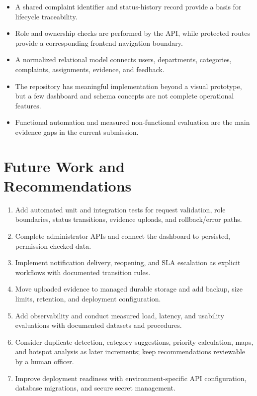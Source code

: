 \documentclass[12pt,a4paper]{report}
\begin{document}
\begin{itemize}
\item A shared complaint identifier and status-history record provide a basis for lifecycle traceability.
\item Role and ownership checks are performed by the API, while protected routes provide a corresponding frontend navigation boundary.
\item A normalized relational model connects users, departments, categories, complaints, assignments, evidence, and feedback.
\item The repository has meaningful implementation beyond a visual prototype, but a few dashboard and schema concepts are not complete operational features.
\item Functional automation and measured non-functional evaluation are the main evidence gaps in the current submission.
\end{itemize}

\section{Future Work and Recommendations}

\begin{enumerate}
\item Add automated unit and integration tests for request validation, role boundaries, status transitions, evidence uploads, and rollback/error paths.
\item Complete administrator APIs and connect the dashboard to persisted, permission-checked data.
\item Implement notification delivery, reopening, and SLA escalation as explicit workflows with documented transition rules.
\item Move uploaded evidence to managed durable storage and add backup, size limits, retention, and deployment configuration.
\item Add observability and conduct measured load, latency, and usability evaluations with documented datasets and procedures.
\item Consider duplicate detection, category suggestions, priority calculation, maps, and hotspot analysis as later increments; keep recommendations reviewable by a human officer.
\item Improve deployment readiness with environment-specific API configuration, database migrations, and secure secret management.
\end{enumerate}
\end{document}
